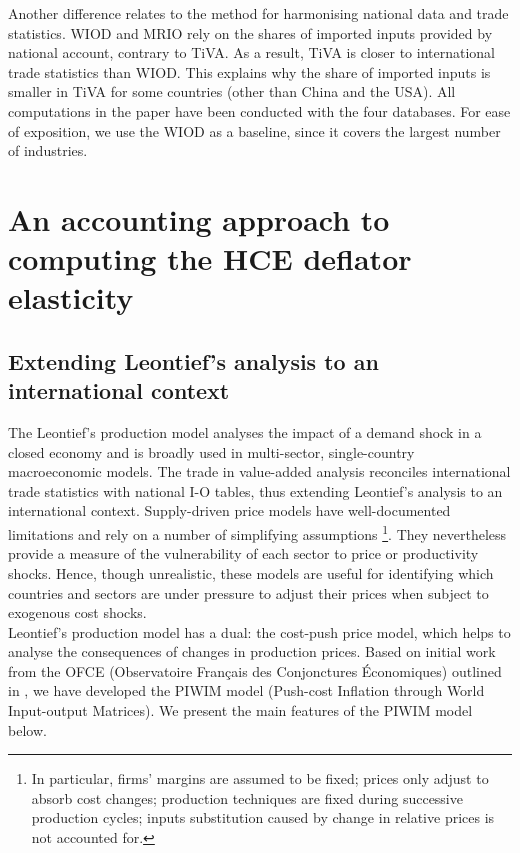 \documentclass[11pt,a4paper]{paper} %
\begin{document}
Another difference relates to the method for harmonising national data and trade statistics. WIOD and MRIO rely on the shares of imported inputs provided by national account, contrary to TiVA. As a result, TiVA is closer to international trade statistics than WIOD. This explains why the share of imported inputs is smaller in TiVA for some countries (other than China and the USA).
All computations in the paper have been conducted with the four databases.
For ease of exposition, we use the WIOD as a baseline, since it covers the largest number of industries.

\section{An accounting approach to computing the HCE deflator elasticity}
\label{sec:metho}

\subsection{Extending Leontief's analysis to an international context}\label{subsec:leontief}

The Leontief's production model analyses the impact of a demand shock in a closed economy \citep{Leontief1951} and is broadly used in multi-sector, single-country macroeconomic models. 
The trade in value-added analysis reconciles international trade statistics with national I-O tables, thus extending Leontief's analysis to an international context.
Supply-driven price models have well-documented limitations \citep{Folloni1994} and rely on a number of simplifying assumptions \footnote{In particular, firms' margins are assumed to be fixed; prices only adjust to absorb cost changes; production techniques are fixed during successive production cycles; inputs substitution caused by change in relative prices is not accounted for.}. 
They nevertheless provide a measure of the vulnerability of each sector to price or productivity shocks. 
Hence, though unrealistic, these models are useful for identifying which countries and sectors are under pressure to adjust their prices when subject to exogenous cost shocks.\\ 
Leontief's production model has a dual: the cost-push price model, which helps to analyse the consequences of changes in production prices.
Based on initial work from the OFCE (Observatoire Français des Conjonctures Économiques) outlined in \cite{Cochard2016}, we have developed the PIWIM model (Push-cost Inflation through World Input-output Matrices). We present the main features of the PIWIM model below. 
\end{document}
